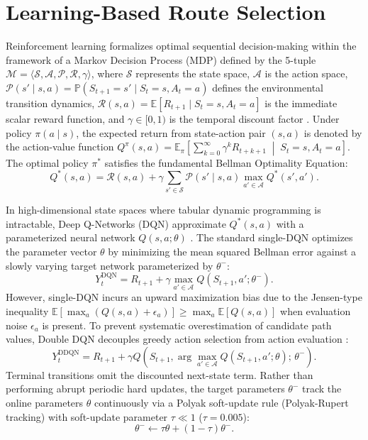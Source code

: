 \documentclass[12pt,a4paper,oneside]{report}
\let\cite\citep
\begin{document}
\section{Learning-Based Route Selection}
Reinforcement learning formalizes optimal sequential decision-making within the framework of a Markov Decision Process (MDP) defined by the 5-tuple $\mathcal{M} = \langle \mathcal{S}, \mathcal{A}, \mathcal{P}, \mathcal{R}, \gamma \rangle$, where $\mathcal{S}$ represents the state space, $\mathcal{A}$ is the action space, $\mathcal{P}(s' \mid s, a) = \mathbb{P}(S_{t+1}=s' \mid S_t=s, A_t=a)$ defines the environmental transition dynamics, $\mathcal{R}(s, a) = \mathbb{E}[R_{t+1} \mid S_t=s, A_t=a]$ is the immediate scalar reward function, and $\gamma \in [0, 1)$ is the temporal discount factor \cite{sutton2018reinforcement}. Under policy $\pi(a \mid s)$, the expected return from state-action pair $(s, a)$ is denoted by the action-value function $Q^\pi(s, a) = \mathbb{E}_\pi \left[ \sum_{k=0}^\infty \gamma^k R_{t+k+1} \;\middle|\; S_t=s, A_t=a \right]$. The optimal policy $\pi^*$ satisfies the fundamental Bellman Optimality Equation:
\begin{equation}
\label{eq:bellman_optimality}
Q^*(s, a) = \mathcal{R}(s, a) + \gamma \sum_{s' \in \mathcal{S}} \mathcal{P}(s' \mid s, a) \max_{a' \in \mathcal{A}} Q^*(s', a').
\end{equation}

In high-dimensional state spaces where tabular dynamic programming is intractable, Deep Q-Networks (DQN) approximate $Q^*(s, a)$ with a parameterized neural network $Q(s, a; \theta)$ \cite{mnih2015human}. The standard single-DQN optimizes the parameter vector $\theta$ by minimizing the mean squared Bellman error against a slowly varying target network parameterized by $\theta^-$:
\begin{equation}
\label{eq:standard_dqn_target}
Y_t^{\text{DQN}} = R_{t+1} + \gamma \max_{a' \in \mathcal{A}} Q(S_{t+1}, a'; \theta^-).
\end{equation}
However, single-DQN incurs an upward maximization bias due to the Jensen-type inequality $\mathbb{E}[\max_a (Q(s, a) + \epsilon_a)] \ge \max_a \mathbb{E}[Q(s, a)]$ when evaluation noise $\epsilon_a$ is present. To prevent systematic overestimation of candidate path values, Double DQN decouples greedy action selection from action evaluation \cite{vanhasselt2016deep}:
\begin{equation}
\label{eq:double_q_target}
Y_t^{\text{DDQN}} = R_{t+1} + \gamma Q\left(S_{t+1}, \arg\max_{a' \in \mathcal{A}} Q(S_{t+1}, a'; \theta); \, \theta^-\right).
\end{equation}
Terminal transitions omit the discounted next-state term. Rather than performing abrupt periodic hard updates, the target parameters $\theta^-$ track the online parameters $\theta$ continuously via a Polyak soft-update rule (Polyak-Rupert tracking) with soft-update parameter $\tau \ll 1$ ($\tau = 0.005$):
\begin{equation}
\label{eq:polyak_target_update}
\theta^- \leftarrow \tau \theta + (1 - \tau) \theta^-.
\end{equation}
\end{document}
